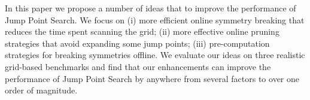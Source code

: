 In this paper we propose a number of ideas that to improve the
performance of Jump Point Search. We focus on (i) more efficient online 
symmetry breaking that reduces the time spent scanning the grid; 
(ii) more effective online pruning strategies that avoid expanding some jump
points; (iii) pre-computation strategies for breaking symmetries offline.
We evaluate our ideas on three realistic grid-based benchmarks and
find that our enhancements can improve the performance of Jump Point Search
by anywhere from several factors to over one order of magnitude. 

